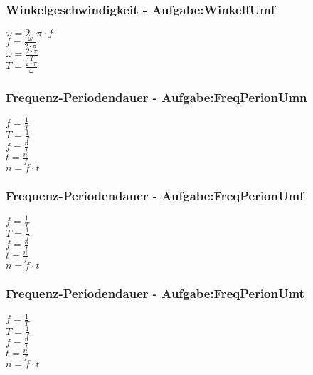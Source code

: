 \subsubsection{Winkelgeschwindigkeit - Aufgabe:WinkelfUmf} 
\begin{minipage}{0.45\textwidth} 
$ \omega  = 2\cdot \pi \cdot f $\\ 
$ f = \frac{\omega }{2\cdot \pi } $\\ 
$ \omega  = \frac{2\cdot \pi }{ T} $\\ 
$ T = \frac{2\cdot \pi }{ \omega } $\\ 
\end{minipage} 
\begin{minipage}{0.45\textwidth} 
 
\end{minipage} 
\subsubsection{Frequenz-Periodendauer - Aufgabe:FreqPerionUmn} 
\begin{minipage}{0.45\textwidth} 
$ f = \frac{1}{T} $\\ 
$ T = \frac{1}{f} $\\ 
$ f = \frac{n}{t} $\\ 
$ t = \frac{n}{f} $\\ 
$ n = f\cdot t $\\ 
\end{minipage} 
\begin{minipage}{0.45\textwidth} 
 
\end{minipage} 
\subsubsection{Frequenz-Periodendauer - Aufgabe:FreqPerionUmf} 
\begin{minipage}{0.45\textwidth} 
$ f = \frac{1}{T} $\\ 
$ T = \frac{1}{f} $\\ 
$ f = \frac{n}{t} $\\ 
$ t = \frac{n}{f} $\\ 
$ n = f\cdot t $\\ 
\end{minipage} 
\begin{minipage}{0.45\textwidth} 
 
\end{minipage} 
\subsubsection{Frequenz-Periodendauer - Aufgabe:FreqPerionUmt} 
\begin{minipage}{0.45\textwidth} 
$ f = \frac{1}{T} $\\ 
$ T = \frac{1}{f} $\\ 
$ f = \frac{n}{t} $\\ 
$ t = \frac{n}{f} $\\ 
$ n = f\cdot t $\\ 
\end{minipage} 
\begin{minipage}{0.45\textwidth} 
 
\end{minipage} 
